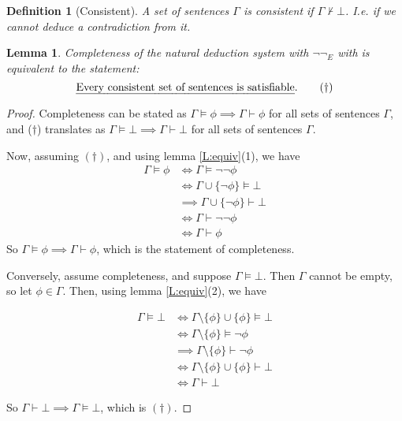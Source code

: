 \documentclass{article}
\theoremstyle{plain}
\newtheorem{definition}[theorem]{Definition}{\bfseries}{\upshape}
\newtheorem{lemma}[theorem]{Lemma}{\bfseries}{\upshape}
\begin{document}
\begin{definition}[Consistent]
A set of sentences $\Gamma$ is \emph{consistent} if $\Gamma\not\vdash \bot$. I.e. if we cannot deduce a contradiction from it.
\end{definition} 

\begin{lemma}\label{L:sat}
Completeness of the natural deduction system with $\neg\neg_E$ with is equivalent to the statement:
\begin{equation*}\text{\emph{Every consistent set of sentences is satisfiable}}.\tag{$\dagger$}\end{equation*}
\end{lemma}
\begin{proof}
Completeness can be stated as $\Gamma\models \phi\implies \Gamma\vdash \phi$ for all sets of sentences $\Gamma$, and ($\dagger$) translates as $\Gamma\models \bot \implies \Gamma\vdash \bot$ for all sets of sentences $\Gamma$.

Now, assuming $(\dagger)$, and using lemma \ref{L:equiv}(1), we have 
\begin{align*}
\Gamma\models \phi &\iff \Gamma\models \neg\neg\phi\\
&\iff\Gamma \cup\{\neg\phi\}\models \bot \\
&\implies \Gamma \cup\{\neg\phi\}\vdash \bot \\
&\iff \Gamma\vdash \neg\neg\phi \\
&\iff \Gamma\vdash \phi
\end{align*}
So $\Gamma\models \phi \implies \Gamma\vdash \phi$, which is the statement of completeness.

Conversely, assume completeness, and suppose $\Gamma\models \bot$. Then $\Gamma$ cannot be empty, so let $\phi\in \Gamma$. Then, using lemma \ref{L:equiv}(2), we have  

\begin{align*}
\Gamma \models \bot &\iff \Gamma\setminus\{\phi\}\cup\{\phi\}\models \bot \\
&\iff  \Gamma\setminus\{\phi\}\models \neg\phi \\
&\implies \Gamma\setminus\{\phi\}\vdash \neg\phi \\
&\iff \Gamma\setminus\{\phi\}\cup\{\phi\}\vdash \bot \\
&\iff \Gamma\vdash\bot
\end{align*}

So $\Gamma\vdash \bot \implies \Gamma\models \bot$, which is $(\dagger)$.
\end{proof}
\end{document}
